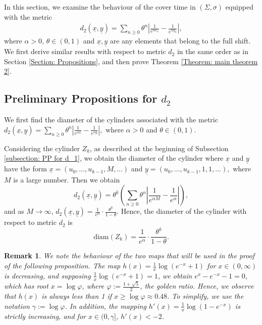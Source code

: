 \documentclass[11pt, reqno]{amsart}
\theoremstyle{plain}%
\newtheorem{remark}[theorem]{Remark}
\theoremstyle{definition}
\theoremstyle{definition}
\def\ulx{\underline{x}}
\def\uly{\underline{y}}
\numberwithin{equation}{section}
\begin{document}
In this section, we examine the behaviour of the cover time in $(\Sigma, \sigma)$ equipped with the metric \begin{align*}
    d_2(\ulx,\underline{y})=\sum_{n\ge 0} \theta^n  \left| \frac{1}{e^{\alpha x_n}} - \frac{1}{e^{\alpha y_n}} \right|,
\end{align*}where $\alpha>0$, $\theta\in(0,1)$ and $\ulx,\uly$ are any elements that belong to the full shift. We first derive similar results with respect to metric $d_2$ in the same order as in Section \ref{Section: Propositions}, and then prove Theorem \ref{Theorem: main theorem 2}.
\subsection{Preliminary Propositions for $d_2$} We first find the diameter of the cylinders associated with the metric $d_2(\ulx,\underline{y})=\sum_{n\ge 0} \theta^n  \left| \frac{1}{e^{\alpha x}} - \frac{1}{e^{\alpha y}} \right|,$ where $\alpha>0$ and $\theta\in(0,1)$. 

Considering the cylinder $Z_k$, as described at the beginning of Subsection \ref{subsection: PP for d_1}, we obtain the diameter of the cylinder where $\ulx$ and $\uly$ have the form  
$\ulx=(u_0,\ldots,u_{k-1},M,\ldots)$ and $\uly=(u_0,\ldots,u_{k-1},1,1,\ldots),$ where $M$ is a large number. Then we obtain
$$ d_2(\ulx,\underline{y})=\theta^k\left(\sum_{n\ge 0} \theta^n \left| \frac{1}{e^{\alpha M}} - \frac{1}{e^{\alpha }} \right|\right),$$
and as $M\to \infty$, $d_2(\ulx,\underline{y})=\frac{1}{e^\alpha} \cdot \frac{\theta^k}{1-\theta}$. Hence, the diameter of the cylinder with respect to metric $d_2$ is
\begin{equation}\label{Diam_Cylinder_Full_d_2}
    \text{diam}(Z_k)=\frac{1}{e^\alpha} \cdot \frac{\theta^k}{1-\theta}. 
\end{equation}

\begin{remark}\label{Remark: golden ration}
   We note the behaviour of the two maps that will be used in the proof of the following proposition. The map $h(x)=\frac{1}{x}\log\left(e^{-x}+1\right)$ for $x\in(0,\infty)$ is decreasing, and supposing $ \frac{1}{x}\log\left(e^{-x}+1\right)=1$, we obtain $e^x-e^{-x}-1=0$, which has root $x=\log\varphi$, where $\varphi:=\frac{1+\sqrt{5}}{2}$, the golden ratio. Hence, we observe that $h(x)$ is always less than 1 if $x\ge \log \varphi\approx 0.48$. To simplify, we use the notation $\gamma:=\log \varphi$.
    In addition, the mapping $h'(x)=\frac{1}{x}\log(1-e^{-x})$ is strictly increasing, and for $x\in(0,\gamma]$, $h'(x)<-2$.
\end{remark}
\end{document}
